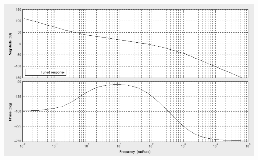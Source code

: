 \documentclass[10pt,fleqn]{article} %
\begin{document}
 \begin{center}
\includegraphics[width=\textwidth]{images/image12}
\end{center} 
\fi
\end{document}
